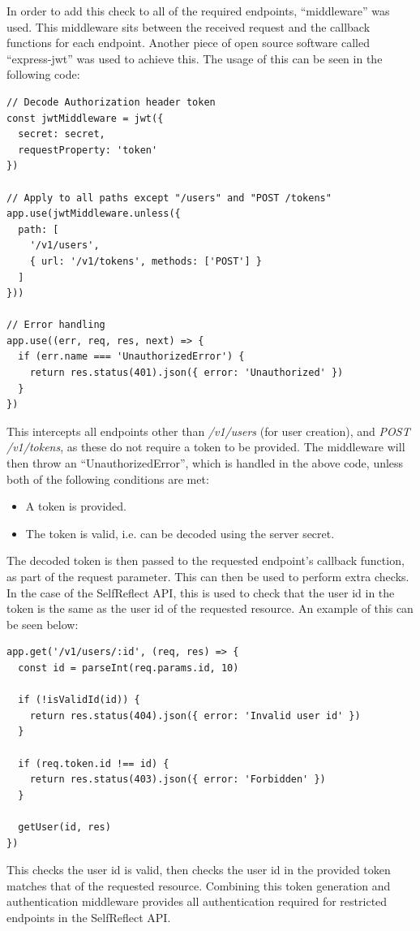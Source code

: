 \documentclass[11pt,openright,a4paper]{report}
\begin{document}
In order to add this check to all of the required endpoints, \enquote{middleware} was used. This middleware sits between the received request and the callback functions for each endpoint. Another piece of open source software called \enquote{express-jwt} \parencite{expressjwt} was used to achieve this. The usage of this can be seen in the following code:

\newpage
\begin{lstlisting}
// Decode Authorization header token
const jwtMiddleware = jwt({
  secret: secret,
  requestProperty: 'token'
})

// Apply to all paths except "/users" and "POST /tokens"
app.use(jwtMiddleware.unless({
  path: [
    '/v1/users',
    { url: '/v1/tokens', methods: ['POST'] }
  ]
}))

// Error handling
app.use((err, req, res, next) => {
  if (err.name === 'UnauthorizedError') {
    return res.status(401).json({ error: 'Unauthorized' })
  }
})
\end{lstlisting}
This intercepts all endpoints other than \emph{/v1/users} (for user creation), and \emph{POST /v1/tokens}, as these do not require a token to be provided. The middleware will then throw an \enquote{UnauthorizedError}, which is handled in the above code, unless both of the following conditions are met:
\begin{itemize}
\item A token is provided.
\item The token is valid, i.e. can be decoded using the server secret.
\end{itemize}

The decoded token is then passed to the requested endpoint's callback function, as part of the request parameter. This can then be used to perform extra checks. In the case of the SelfReflect API, this is used to check that the user id in the token is the same as the user id of the requested resource. An example of this can be seen below:
\begin{lstlisting}
app.get('/v1/users/:id', (req, res) => {
  const id = parseInt(req.params.id, 10)

  if (!isValidId(id)) {
    return res.status(404).json({ error: 'Invalid user id' })
  }

  if (req.token.id !== id) {
    return res.status(403).json({ error: 'Forbidden' })
  }

  getUser(id, res)
})
\end{lstlisting}

This checks the user id is valid, then checks the user id in the provided token matches that of the requested resource. Combining this token generation and authentication middleware provides all authentication required for restricted endpoints in the SelfReflect API.
\end{document}
